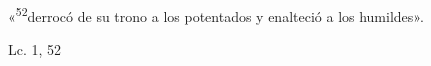 \documentclass[../../rosario.tex]{subfiles}
\begin{document}
    «\textsuperscript{52}derrocó de su trono a los potentados y enalteció a los humildes».
    \begin{flushright}
    Lc. 1, 52       
    \end{flushright}
\end{document}
